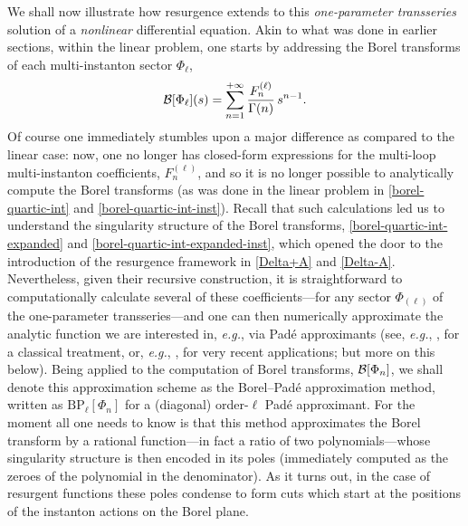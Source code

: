 \documentclass[11pt,a4paper]{article}
\newcommand{\CB}{{\cal B}}
\newcommand{\be}{\begin{equation}}
\newcommand{\ee}{\end{equation}}
\begin{document}
We shall now illustrate how resurgence extends to this \textit{one-parameter transseries} solution of a \textit{nonlinear} differential equation. Akin to what was done in earlier sections, within the linear problem, one starts by addressing the Borel transforms of each multi-instanton sector $\Phi_{\ell}$,
%
\be
\CB [\Phi_{\ell}] (s) = \sum_{n=1}^{+\infty} \frac{F_n^{(\ell)}}{\Gamma(n)}\, s^{n-1}.
\ee
%
\noindent
Of course one immediately stumbles upon a major difference as compared to the linear case: now, one no longer has closed-form expressions for the multi-loop multi-instanton coefficients, $F_n^{(\ell)}$, and so it is no longer possible to analytically compute the Borel transforms (as was done in the linear problem in \eqref{borel-quartic-int} and \eqref{borel-quartic-int-inst}). Recall that such calculations led us to understand the singularity structure of the Borel transforms, \eqref{borel-quartic-int-expanded} and \eqref{borel-quartic-int-expanded-inst}, which opened the door to the introduction of the resurgence framework in \eqref{Delta+A} and \eqref{Delta-A}. Nevertheless, given their recursive construction, it is straightforward to computationally calculate several of these coefficients---for any sector $\Phi_{(\ell)}$ of the one-parameter transseries---and one can then numerically approximate the analytic function we are interested in, \textit{e.g.}, via Pad\'{e} approximants (see, \textit{e.g.}, \cite{bo78}, for a classical treatment, or, \textit{e.g.}, \cite{as17}, for very recent applications; but more on this below). Being applied to the computation of Borel transforms, $\CB [\Phi_n]$, we shall denote this approximation scheme as the Borel--Pad\'{e} approximation method, written as $\mathrm{BP}_{\ell} [\Phi_n]$ for a (diagonal) order-$\ell$ Pad\'e approximant. For the moment all one needs to know is that this method approximates the Borel transform by a rational function---in fact a ratio of two polynomials---whose singularity structure is then encoded in its poles (immediately computed as the zeroes of the polynomial in the denominator). As it turns out, in the case of resurgent functions these poles condense to form cuts which start at the positions of the instanton actions on the Borel plane. 
\end{document}
